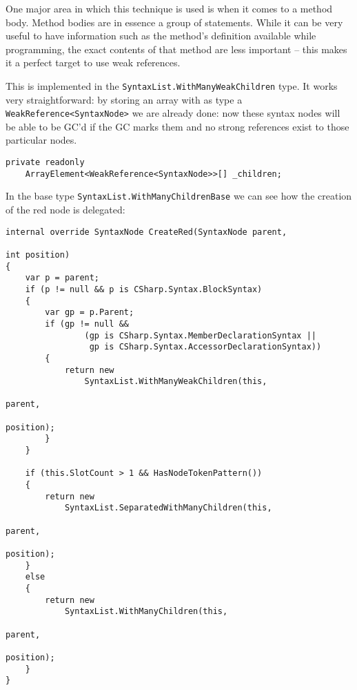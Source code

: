 One major area in which this technique is used is when it comes to a method body. Method bodies are in essence a group of statements. While it can be very useful to have information such as the method's definition available while programming, the exact contents of that method are less important -- this makes it a perfect target to use weak references.

This is implemented in the \verb|SyntaxList.WithManyWeakChildren| type. It works very straightforward: by storing an array with as type a \verb|WeakReference<SyntaxNode>| we are already done: now these syntax nodes will be able to be GC'd if the GC marks them and no strong references exist to those particular nodes.

\begin{lstlisting}
private readonly 
	ArrayElement<WeakReference<SyntaxNode>>[] _children;
\end{lstlisting}

\noindent In the base type \verb|SyntaxList.WithManyChildrenBase| we can see how the creation of the red node is delegated:

\begin{lstlisting}
internal override SyntaxNode CreateRed(SyntaxNode parent, 
																			 int position)
{
	var p = parent;
	if (p != null && p is CSharp.Syntax.BlockSyntax)
	{
		var gp = p.Parent;
		if (gp != null && 
				(gp is CSharp.Syntax.MemberDeclarationSyntax || 
				 gp is CSharp.Syntax.AccessorDeclarationSyntax))
		{
			return new 
				SyntaxList.WithManyWeakChildren(this, 
																				parent, 
																				position);
		}
	}

	if (this.SlotCount > 1 && HasNodeTokenPattern())
	{
		return new 
			SyntaxList.SeparatedWithManyChildren(this, 
																					 parent, 
																					 position);
	}
	else
	{
		return new 
			SyntaxList.WithManyChildren(this, 
																	parent, 
																	position);
	}
}
\end{lstlisting}
